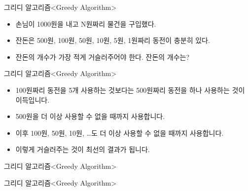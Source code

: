 \begin{frame}{그리디 알고리즘}{<Greedy Algorithm>}
  \begin{center}
  \end{center}
  \vspace{4mm}
  \begin{itemize}
    \item 손님이 1000원을 내고 N원짜리 물건을 구입했다.
    \item 잔돈은 500원, 100원, 50원, 10원, 5원, 1원짜리 동전이 충분히 있다.
    \item 잔돈의 개수가 가장 적게 거슬러주어야 한다. \alert{잔돈의 개수는?}
  \end{itemize}
\end{frame}

\begin{frame}{그리디 알고리즘}{<Greedy Algorithm>}
  \begin{center}
  \end{center}
  \vspace{4mm}
  \begin{itemize}
    \item 100원짜리 동전을 5개 사용하는 것보다는 500원짜리 동전을 하나 사용하는 것이 이득입니다.
    \item 500원을 더 이상 사용할 수 없을 때까지 사용합니다.
    \item 이후 100원, 50원, 10원, …도 더 이상 사용할 수 없을 때까지 사용합니다.
    \item 이렇게 거슬러주는 것이 \alert{최선의 결과}가 됩니다.
  \end{itemize}
\end{frame}

\begin{frame}{그리디 알고리즘}{<Greedy Algorithm>}
\end{frame}

\begin{frame}{그리디 알고리즘}{<Greedy Algorithm>}
\end{frame}

